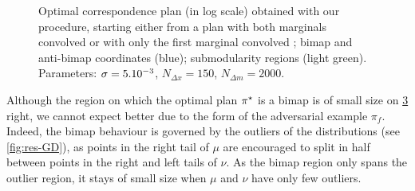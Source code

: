                     \begin{figure}[h]
                        \centering
                        \begin{subfigure}[b]{.49\linewidth}
                            \centering
                            
                            \vspace{-6mm}
                            \label{fig:res-bimap-a}
                        \end{subfigure}
                        \hfill
                        \begin{subfigure}[b]{.49\linewidth}
                            \centering
                            
                            \vspace{-6mm}
                            \label{fig:res-bimap-b}
                        \end{subfigure}
                            \caption{Optimal correspondence plan (in log scale) obtained with our procedure, starting either from a plan with both marginals convolved \capleft or with only the first marginal convolved \capright; bimap and anti-bimap coordinates (\textcolor{tabblue}{blue}); submodularity regions (\textcolor{tabgreen!60}{light green}). Parameters: $\sigma=\smash{5.10^{-3}}$, $N_{\Delta x}=150$, $N_{\Delta m}=2000$.
                            }
                        \label{fig:res-bimap}
                    \end{figure}
                    \begin{remark}
                        Although the region on which the optimal plan $\pi^\star$ is a bimap is of small size on \cref{fig:res-bimap} right, we cannot expect better due to the form of the adversarial example $\pi_f$. Indeed, the bimap behaviour is governed by the outliers of the distributions (see \cref{fig:res-GD}), as points in the right tail of $\mu$ are encouraged to split in half between points in the right and left tails of $\nu$. As the bimap region only spans the outlier region, it stays of small size when $\mu$ and $\nu$ have only few outliers.
                    \end{remark}

            \clearpage

